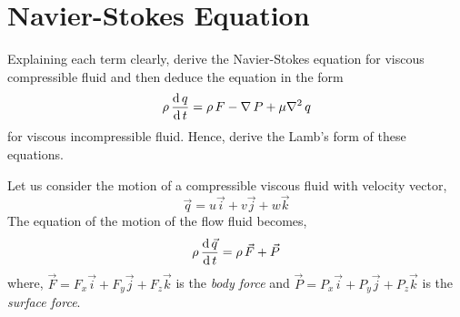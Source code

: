 \documentclass[../main-sheet.tex]{subfiles}
\begin{document}
\chapter{Navier-Stokes Equation}
\begin{prob}
    Explaining each term clearly, derive the Navier-Stokes equation for viscous compressible fluid and then deduce the equation in the form 
    \[\rho \,\frac{\mathrm{d}\,q}{\mathrm{d}\,t}=\rho \,F-\nabla\,P+\mu\nabla^2\,q\]
    for viscous incompressible fluid. Hence, derive the Lamb's form of these equations.
\end{prob}
\begin{soln}
    Let us consider the motion of a compressible viscous fluid with velocity vector,
    \[\vec{q}=u\vec{i}+v\vec{j}+w\vec{k}\]
    The equation of the motion of the flow fluid becomes,
    \[\rho\,\frac{\mathrm{d}\,\vec{q}}{\mathrm{d}\,t}=\rho\,\vec{F}+\vec{P}\]
    where, \(\vec{F}=F_x\vec{i}+F_y\vec{j}+F_z\vec{k}\) is the \emph{body force} and \(\vec{P}=P_x\vec{i}+P_y\vec{j}+P_z\vec{k}\) is the \emph{surface force}.\\
    

\end{soln}
\end{document}
